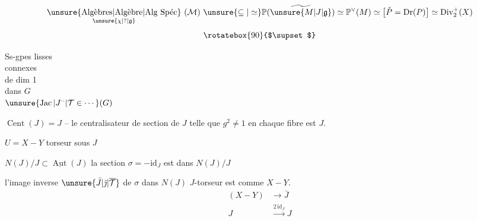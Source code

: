 \[
\underset{\unsure{\chi|?|\mathfrak g}}{\text{\unsure{Algèbres|Algèbre|Alg Spéc}}}\ (\mathcal M)
\ \unsure{\subseteq|\simeq}\mathbb P(\widetilde{\unsure{M|J|\mathfrak g}})
\simeq \mathbb P^\vee(M)\simeq
\bigl[\check P=\mathrm{Dr}(P)\bigr]\simeq \operatorname{Div}^{+}_{2}(X)
\]
\[
\rotatebox{90}{$\supset$}
\]
\begin{center}
Ss-gpes lisses\\
connexes \\
 de dim 1\\
dans $G$\\[2pt]
$\unsure{\operatorname{Jac}|J^{\cdot\cdot}|\mathcal T\in\cdots}(G)$
\end{center}

$\operatorname{Cent}(J)=J$ -- le centralisateur de   section de $J$ telle que $g^2\ne1$ en chaque fibre est $J$.

$U=X-Y$ torseur sous $J$


 $N(J)/J\subset\underline{\operatorname{Aut}}(J)$  la section $\sigma=-\mathrm{id}_J$ est dans $N(J)/J$

  l'image inverse $\unsure{\bar J|\bar{\jmath}|\overline{\mathcal T}}$ de $\sigma$ dans $N(J)$    $J$-torseur  est comme $X-Y$.   
\[
\begin{aligned}
(X-Y)&\longrightarrow\bar J\\
J&\xrightarrow{2\,\mathrm{id}_J} J
\end{aligned}
\]
